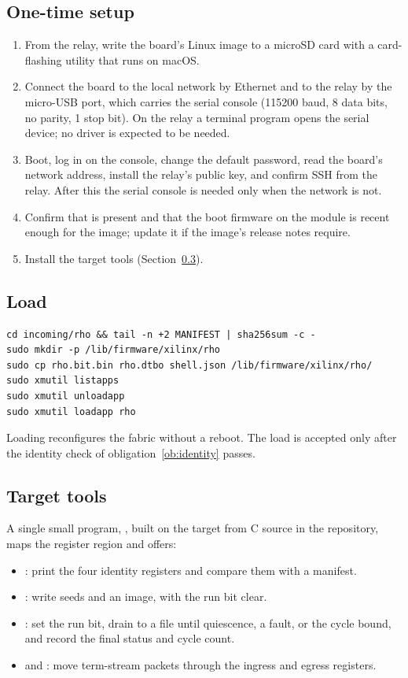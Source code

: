 \subsection{One-time setup}
\begin{enumerate}
\item From the relay, write the board's Linux image to a microSD card with a
card-flashing utility that runs on macOS.
\item Connect the board to the local network by Ethernet and to the relay by
the micro-USB port, which carries the serial console (115200 baud, 8 data
bits, no parity, 1 stop bit). On the relay a terminal program opens the
serial device; no driver is expected to be needed.
\item Boot, log in on the console, change the default password, read the
board's network address, install the relay's public key, and confirm SSH
from the relay. After this the serial console is needed only when the
network is not.
\item Confirm that  is present and that the boot firmware on the
module is recent enough for the image; update it if the image's release
notes require.
\item Install the target tools (Section~\ref{sec:tools}).
\end{enumerate}

\subsection{Load}\label{sec:load}
\begin{lstlisting}
cd incoming/rho && tail -n +2 MANIFEST | sha256sum -c -
sudo mkdir -p /lib/firmware/xilinx/rho
sudo cp rho.bit.bin rho.dtbo shell.json /lib/firmware/xilinx/rho/
sudo xmutil listapps
sudo xmutil unloadapp
sudo xmutil loadapp rho
\end{lstlisting}
Loading reconfigures the fabric without a reboot. The load is accepted only
after the identity check of obligation~\ref{ob:identity} passes.

\subsection{Target tools}\label{sec:tools}
A single small program, , built on the target from C source in
the repository, maps the register region and offers:
\begin{itemize}
\item {}: print the four identity registers and compare them
with a manifest.
\item {}: write seeds and an image, with the run bit
clear.
\item {}: set the run bit, drain
 to a file until quiescence, a fault, or the cycle bound, and
record the final status and cycle count.
\item {} and : move term-stream packets
through the ingress and egress registers.
\end{itemize}

